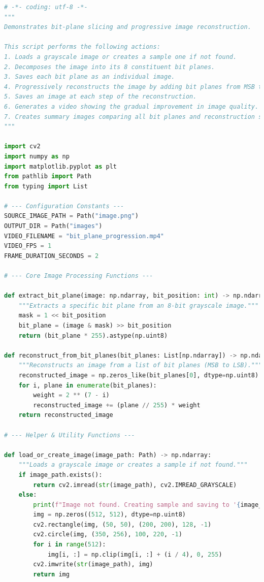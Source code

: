 \documentclass{article}
\begin{document}
\begin{lstlisting}[language=Python, caption={Rewritten Python script for bit-plane slicing and reconstruction.}, label={lst:code}]
# -*- coding: utf-8 -*-
"""
Demonstrates bit-plane slicing and progressive image reconstruction.

This script performs the following actions:
1. Loads a grayscale image or creates a sample one if not found.
2. Decomposes the image into its 8 constituent bit planes.
3. Saves each bit plane as an individual image.
4. Progressively reconstructs the image by adding bit planes from MSB to LSB.
5. Saves an image at each step of the reconstruction.
6. Generates a video showing the gradual improvement in image quality.
7. Creates summary images comparing all bit planes and reconstruction steps.
"""

import cv2
import numpy as np
import matplotlib.pyplot as plt
from pathlib import Path
from typing import List

# --- Configuration Constants ---
SOURCE_IMAGE_PATH = Path("image.png")
OUTPUT_DIR = Path("images")
VIDEO_FILENAME = "bit_plane_progression.mp4"
VIDEO_FPS = 1
FRAME_DURATION_SECONDS = 2

# --- Core Image Processing Functions ---

def extract_bit_plane(image: np.ndarray, bit_position: int) -> np.ndarray:
    """Extracts a specific bit plane from an 8-bit grayscale image."""
    mask = 1 << bit_position
    bit_plane = (image & mask) >> bit_position
    return (bit_plane * 255).astype(np.uint8)

def reconstruct_from_bit_planes(bit_planes: List[np.ndarray]) -> np.ndarray:
    """Reconstructs an image from a list of bit planes (MSB to LSB)."""
    reconstructed_image = np.zeros_like(bit_planes[0], dtype=np.uint8)
    for i, plane in enumerate(bit_planes):
        weight = 2 ** (7 - i)
        reconstructed_image += (plane // 255) * weight
    return reconstructed_image

# --- Helper & Utility Functions ---

def load_or_create_image(image_path: Path) -> np.ndarray:
    """Loads a grayscale image or creates a sample if not found."""
    if image_path.exists():
        return cv2.imread(str(image_path), cv2.IMREAD_GRAYSCALE)
    else:
        print(f"Image not found. Creating sample and saving to '{image_path}'")
        img = np.zeros((512, 512), dtype=np.uint8)
        cv2.rectangle(img, (50, 50), (200, 200), 128, -1)
        cv2.circle(img, (350, 256), 100, 220, -1)
        for i in range(512):
            img[i, :] = np.clip(img[i, :] + (i / 4), 0, 255)
        cv2.imwrite(str(image_path), img)
        return img


\end{lstlisting}
\end{document}

